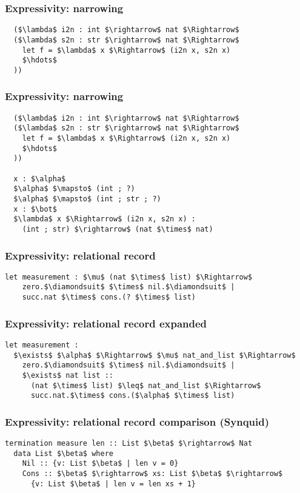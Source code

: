 \documentclass{beamer}
\begin{document}
\begin{frame}[fragile]
  \frametitle{Expressivity: narrowing}

  \begin{lstlisting}
  ($\lambda$ i2n : int $\rightarrow$ nat $\Rightarrow$ 
  ($\lambda$ s2n : str $\rightarrow$ nat $\Rightarrow$ 
    let f = $\lambda$ x $\Rightarrow$ (i2n x, s2n x)
    $\hdots$
  ))
  \end{lstlisting}
\end{frame}

\begin{frame}[fragile]
  \frametitle{Expressivity: narrowing}

  \begin{lstlisting}
  ($\lambda$ i2n : int $\rightarrow$ nat $\Rightarrow$ 
  ($\lambda$ s2n : str $\rightarrow$ nat $\Rightarrow$ 
    let f = $\lambda$ x $\Rightarrow$ (i2n x, s2n x)
    $\hdots$
  ))
  
  x : $\alpha$
  $\alpha$ $\mapsto$ (int ; ?)
  $\alpha$ $\mapsto$ (int ; str ; ?)
  x : $\bot$
  $\lambda$ x $\Rightarrow$ (i2n x, s2n x) : 
    (int ; str) $\rightarrow$ (nat $\times$ nat) 
  \end{lstlisting}
\end{frame}

\begin{frame}[fragile]
  \frametitle{Expressivity: relational record}

  \begin{lstlisting}[]
  let measurement : $\mu$ (nat $\times$ list) $\Rightarrow$ 
    zero.$\diamondsuit$ $\times$ nil.$\diamondsuit$ | 
    succ.nat $\times$ cons.(? $\times$ list)
  \end{lstlisting} 

\end{frame}

\begin{frame}[fragile]
  \frametitle{Expressivity: relational record expanded}

  \begin{lstlisting}[]
  let measurement : 
  $\exists$ $\alpha$ $\Rightarrow$ $\mu$ nat_and_list $\Rightarrow$ 
    zero.$\diamondsuit$ $\times$ nil.$\diamondsuit$ | 
    $\exists$ nat list :: 
      (nat $\times$ list) $\leq$ nat_and_list $\Rightarrow$ 
      succ.nat.$\times$ cons.($\alpha$ $\times$ list)
  \end{lstlisting}

\end{frame}

\begin{frame}[fragile]
  \frametitle{Expressivity: relational record comparison (Synquid)}

  \begin{lstlisting}[keywords={termination, measure, data, where}]
  termination measure len :: List $\beta$ $\rightarrow$ Nat 
  data List $\beta$ where
    Nil :: {v: List $\beta$ | len v = 0}
    Cons :: $\beta$ $\rightarrow$ xs: List $\beta$ $\rightarrow$ 
      {v: List $\beta$ | len v = len xs + 1}

  \end{lstlisting}
\end{frame}
\end{document}
